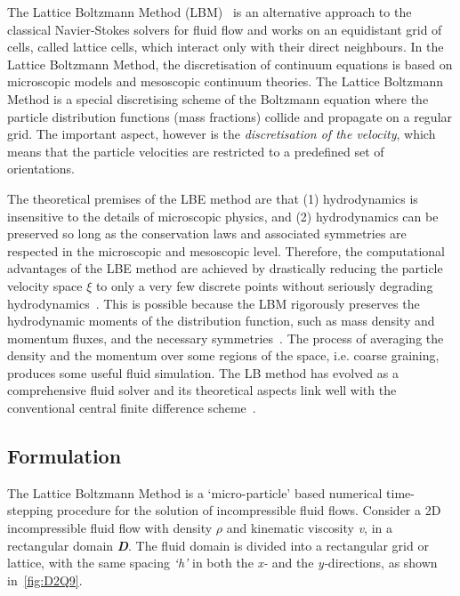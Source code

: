 The Lattice Boltzmann Method
(LBM)~\citep{He1997a,He1997b,Chen1998,Mei2000,Han2007,Zhou2012} is an
alternative approach to the classical Navier-Stokes solvers for fluid flow and 
works on an equidistant grid of cells, called lattice cells, which interact 
only with their direct neighbours. In the Lattice Boltzmann Method, the 
discretisation of continuum equations is based on microscopic models and 
mesoscopic continuum theories. The Lattice Boltzmann Method is a special 
discretising scheme of the Boltzmann equation where the particle distribution 
functions (mass fractions) collide and propagate on a regular grid. The 
important aspect, however is the \textit{discretisation of the velocity}, which 
means that the particle velocities are restricted to a predefined set of 
orientations.

The theoretical premises of the LBE method are that (1) hydrodynamics is 
insensitive to the details of microscopic physics, and (2) hydrodynamics can be 
preserved so long as the conservation laws and associated symmetries are 
respected in the microscopic and mesoscopic level. Therefore, the computational 
advantages of the LBE method are achieved by drastically reducing the particle 
velocity space $\xi$ to only a very few discrete points without seriously 
degrading hydrodynamics~\citep{Mei2000}. This is possible because the LBM 
rigorously preserves the hydrodynamic moments of the distribution function, 
such as mass density and momentum fluxes, and the necessary 
symmetries~\citep{He1997a,He1997b}. The process of averaging the density and 
the momentum over some regions of the space, i.e. coarse graining, produces 
some useful fluid simulation. The LB method has evolved as a comprehensive 
fluid solver and its theoretical aspects link well with the conventional 
central finite difference scheme~\citep{Cook2004}.

\subsection{Formulation}

The Lattice Boltzmann Method is a `micro-particle' based numerical 
time-stepping procedure for the solution of incompressible fluid flows. 
Consider a 2D incompressible fluid flow with density $\rho$ and kinematic 
viscosity \textit{v}, in a rectangular domain \textit{\textbf{D}}. The fluid 
domain is divided into a rectangular grid or lattice, with the same spacing 
\textit{`h'} in both the \textit{x-} and the \textit{y-}directions, as shown 
in~\cref{fig:D2Q9}. 

